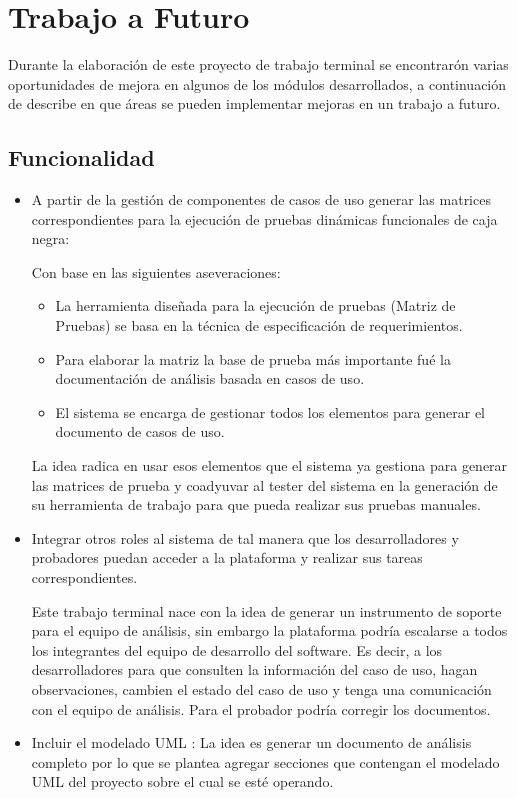 \chapter{Trabajo a Futuro} \label{cap:once}
Durante la elaboración de este proyecto de trabajo terminal se encontrarón varias oportunidades de mejora en algunos de los módulos desarrollados, a continuación de describe en que áreas se pueden implementar mejoras en un trabajo a futuro.

\section{Funcionalidad}
\begin{itemize}
	\item A partir de la gestión de componentes de casos de uso generar las matrices correspondientes para la ejecución de pruebas dinámicas funcionales de caja negra:
	
	Con base en las siguientes aseveraciones:
	\begin{itemize}
	\item La herramienta diseñada para la ejecución de pruebas (Matriz de Pruebas) se basa en la  técnica de especificación de requerimientos.
	\item Para elaborar la matriz la base de prueba más importante fué la documentación de análisis basada en casos de uso.
	\item El sistema se encarga de gestionar todos los elementos para generar el documento de casos de uso.
	\end{itemize}

	La idea radica en usar esos elementos que el sistema ya gestiona para generar las matrices de prueba y coadyuvar al tester del sistema en la generación  de su herramienta de trabajo para que pueda realizar sus pruebas manuales.
	
	\item Integrar otros roles al sistema de tal manera que los desarrolladores y probadores puedan acceder a la plataforma y realizar sus tareas correspondientes.
	
	Este trabajo terminal nace con la idea de generar un instrumento de soporte para el equipo de análisis, sin embargo la plataforma podría escalarse a todos los integrantes del equipo de desarrollo del software. Es decir, a los desarrolladores para que consulten la información del caso de uso, hagan observaciones, cambien el estado del caso de uso y tenga una comunicación con el equipo de análisis. Para el probador podría corregir los documentos.
	
	\item Incluir el modelado UML : La idea es generar un documento de análisis completo por lo que se plantea agregar secciones que contengan el modelado UML del proyecto sobre el cual se esté operando. 
\end{itemize}
 